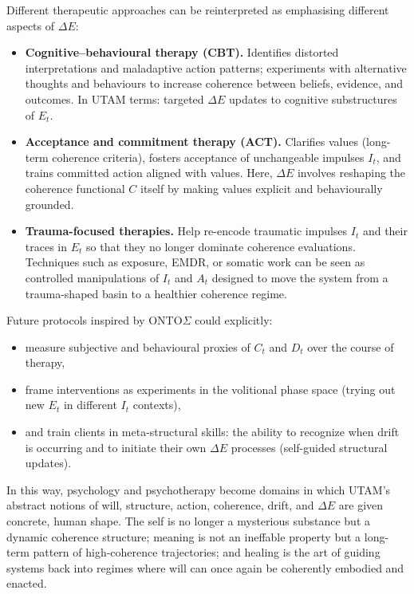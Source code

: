 \documentclass[12pt,a4paper]{report}
\begin{document}
Different therapeutic approaches can be reinterpreted as emphasising different aspects of $\Delta E$:

\begin{itemize}[leftmargin=2em]
    \item \textbf{Cognitive–behavioural therapy (CBT).} Identifies distorted interpretations and maladaptive action patterns; experiments with alternative thoughts and behaviours to increase coherence between beliefs, evidence, and outcomes. In UTAM terms: targeted $\Delta E$ updates to cognitive substructures of \(E_t\).
    \item \textbf{Acceptance and commitment therapy (ACT).} Clarifies values (long-term coherence criteria), fosters acceptance of unchangeable impulses \(I_t\), and trains committed action aligned with values. Here, \(\Delta E\) involves reshaping the coherence functional \(C\) itself by making values explicit and behaviourally grounded.
    \item \textbf{Trauma-focused therapies.} Help re-encode traumatic impulses \(I_t\) and their traces in \(E_t\) so that they no longer dominate coherence evaluations. Techniques such as exposure, EMDR, or somatic work can be seen as controlled manipulations of \(I_t\) and \(A_t\) designed to move the system from a trauma-shaped basin to a healthier coherence regime.
\end{itemize}

Future protocols inspired by ONTO$\Sigma$ could explicitly:

\begin{itemize}[leftmargin=2em]
    \item measure subjective and behavioural proxies of \(C_t\) and \(D_t\) over the course of therapy,
    \item frame interventions as experiments in the volitional phase space (trying out new \(E_t\) in different \(I_t\) contexts),
    \item and train clients in meta-structural skills: the ability to recognize when drift is occurring and to initiate their own $\Delta E$ processes (self-guided structural updates).
\end{itemize}

In this way, psychology and psychotherapy become domains in which UTAM's abstract notions of will, structure, action, coherence, drift, and $\Delta E$ are given concrete, human shape. The self is no longer a mysterious substance but a dynamic coherence structure; meaning is not an ineffable property but a long-term pattern of high-coherence trajectories; and healing is the art of guiding systems back into regimes where will can once again be coherently embodied and enacted.
\end{document}
